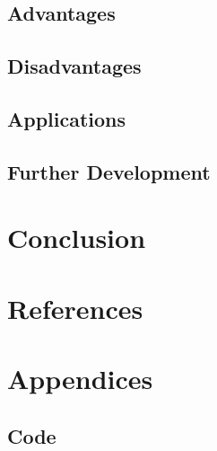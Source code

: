 \documentclass[11pt]{article}
\begin{document}
\subsection{Advantages}
\subsection{Disadvantages}
\subsection{Applications}
\subsection{Further Development}

\clearpage
\section{Conclusion}


\clearpage
\section{References}
\printbibliography[heading=none]

\clearpage
\section{Appendices}
\subsection{Code}
\end{document}
